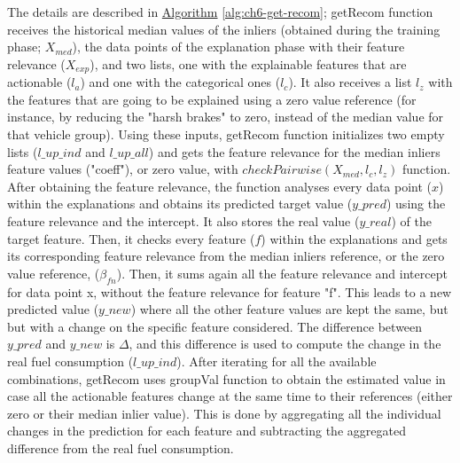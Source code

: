 The details are described in \hyperref[alg:ch6-get-recom]{Algorithm} \ref{alg:ch6-get-recom}; getRecom function receives the historical median values of the inliers (obtained during the training phase; $X_{med}$), the data points of the explanation phase with their feature relevance ($X_{exp}$), and two lists, one with the explainable features that are actionable ($l_a$) and one with the categorical ones ($l_c$). It also receives a list $l_z$ with the features that are going to be explained using a zero value reference (for instance, by reducing the "harsh brakes" to zero, instead of the median value for that vehicle group). Using these inputs, getRecom function initializes two empty lists ($l\_up\_ind$ and $l\_up\_all$) and gets the feature relevance for the median inliers feature values ("coeff"), or zero value, with $checkPairwise(X_{med}, l_c, l_z)$ function. 
After obtaining the feature relevance, the function analyses every data point ($x$) within the explanations and obtains its predicted target value ($y\_pred$) using the feature relevance and the intercept. It also stores the real value ($y\_real$) of the target feature. Then, it checks every feature ($f$) within the explanations and gets its corresponding feature relevance from the median inliers reference, or the zero value reference, ($\beta_{fn}$). Then, it sums again all the feature relevance and intercept for data point x, without the feature relevance for feature "f". This leads to a new predicted value ($y\_new$) where all the other feature values are kept the same, but but with a change on the specific feature considered. The difference between $y\_pred$ and $y\_new$ is $\Delta$, and this difference is used to compute the change in the real fuel consumption ($l\_up\_ind$). After iterating for all the available combinations, getRecom uses groupVal function to obtain the estimated value in case all the actionable features change at the same time to their references (either zero or their median inlier value). This is done by aggregating all the individual changes in the prediction for each feature and subtracting the aggregated difference from the real fuel consumption.

